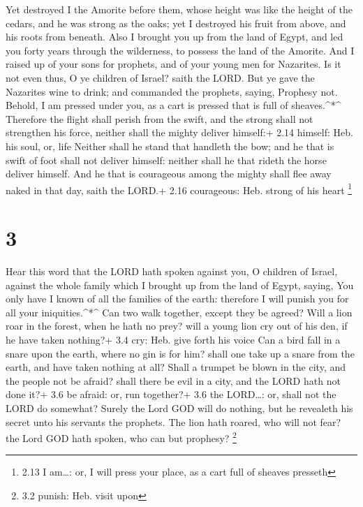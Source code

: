  Yet destroyed I the Amorite before them, whose height was
like the height of the cedars, and he was strong as the oaks; yet I
destroyed his fruit from above, and his roots from beneath.
 Also I brought you up from the land of Egypt, and led you
forty years through the wilderness, to possess the land of the Amorite.
 And I raised up of your sons for prophets, and of your
young men for Nazarites. Is it not even thus, O ye children of Israel?
saith the LORD.  But ye gave the Nazarites wine to drink;
and commanded the prophets, saying, Prophesy not.  Behold,
I am pressed under you, as a cart is pressed that is full of
sheaves.\^{}*\^{}  Therefore the flight shall perish from
the swift, and the strong shall not strengthen his force, neither shall
the mighty deliver himself:+ 2.14 himself: Heb. his soul, or, life
 Neither shall he stand that handleth the bow; and he that
is swift of foot shall not deliver himself: neither shall he that rideth
the horse deliver himself.  And he that is courageous among
the mighty shall flee away naked in that day, saith the LORD.+ 2.16
courageous: Heb. strong of his heart \footnote{2.13 I am\ldots: or, I
  will press your place, as a cart full of sheaves presseth}

\hypertarget{section-2}{%
\section{3}\label{section-2}}

 Hear this word that the LORD hath spoken against you, O
children of Israel, against the whole family which I brought up from the
land of Egypt, saying,  You only have I known of all the
families of the earth: therefore I will punish you for all your
iniquities.\^{}*\^{}  Can two walk together, except they be
agreed?  Will a lion roar in the forest, when he hath no
prey? will a young lion cry out of his den, if he have taken nothing?+
3.4 cry: Heb. give forth his voice  Can a bird fall in a
snare upon the earth, where no gin is for him? shall one take up a snare
from the earth, and have taken nothing at all?  Shall a
trumpet be blown in the city, and the people not be afraid? shall there
be evil in a city, and the LORD hath not done it?+ 3.6 be afraid: or,
run together?+ 3.6 the LORD\ldots: or, shall not the LORD do somewhat?
 Surely the Lord GOD will do nothing, but he revealeth his
secret unto his servants the prophets.  The lion hath
roared, who will not fear? the Lord GOD hath spoken, who can but
prophesy? \footnote{3.2 punish: Heb. visit upon}

